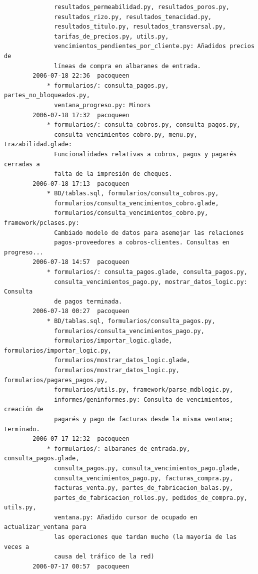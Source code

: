 \documentclass[a4paper]{article}
\begin{document}
\begin{verbatim}
              resultados_permeabilidad.py, resultados_poros.py,
              resultados_rizo.py, resultados_tenacidad.py,
              resultados_titulo.py, resultados_transversal.py,
              tarifas_de_precios.py, utils.py,
              vencimientos_pendientes_por_cliente.py: Añadidos precios de
              líneas de compra en albaranes de entrada.
        2006-07-18 22:36  pacoqueen
            * formularios/: consulta_pagos.py, partes_no_bloqueados.py,
              ventana_progreso.py: Minors
        2006-07-18 17:32  pacoqueen
            * formularios/: consulta_cobros.py, consulta_pagos.py,
              consulta_vencimientos_cobro.py, menu.py, trazabilidad.glade:
              Funcionalidades relativas a cobros, pagos y pagarés cerradas a
              falta de la impresión de cheques.
        2006-07-18 17:13  pacoqueen
            * BD/tablas.sql, formularios/consulta_cobros.py,
              formularios/consulta_vencimientos_cobro.glade,
              formularios/consulta_vencimientos_cobro.py, framework/pclases.py:
              Cambiado modelo de datos para asemejar las relaciones
              pagos-proveedores a cobros-clientes. Consultas en progreso...
        2006-07-18 14:57  pacoqueen
            * formularios/: consulta_pagos.glade, consulta_pagos.py,
              consulta_vencimientos_pago.py, mostrar_datos_logic.py: Consulta
              de pagos terminada.
        2006-07-18 00:27  pacoqueen
            * BD/tablas.sql, formularios/consulta_pagos.py,
              formularios/consulta_vencimientos_pago.py,
              formularios/importar_logic.glade, formularios/importar_logic.py,
              formularios/mostrar_datos_logic.glade,
              formularios/mostrar_datos_logic.py, formularios/pagares_pagos.py,
              formularios/utils.py, framework/parse_mdblogic.py,
              informes/geninformes.py: Consulta de vencimientos, creación de
              pagarés y pago de facturas desde la misma ventana; terminado.
        2006-07-17 12:32  pacoqueen
            * formularios/: albaranes_de_entrada.py, consulta_pagos.glade,
              consulta_pagos.py, consulta_vencimientos_pago.glade,
              consulta_vencimientos_pago.py, facturas_compra.py,
              facturas_venta.py, partes_de_fabricacion_balas.py,
              partes_de_fabricacion_rollos.py, pedidos_de_compra.py, utils.py,
              ventana.py: Añadido cursor de ocupado en actualizar_ventana para
              las operaciones que tardan mucho (la mayoría de las veces a
              causa del tráfico de la red)
        2006-07-17 00:57  pacoqueen

\end{verbatim}
\end{document}
